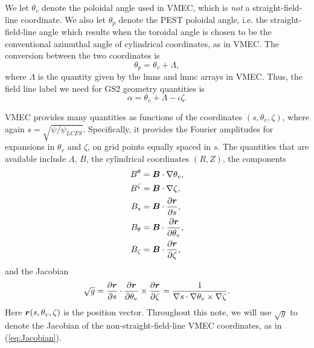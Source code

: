 \documentclass[11pt,letter]{article}
\newcommand{\vect}[1]{\mbox{\boldmath $#1$}}
\begin{document}
We let $\theta_v$ denote the poloidal angle used in VMEC, which is \emph{not} a straight-field-line coordinate.
We also let $\theta_p$ denote the PEST poloidal angle, i.e. the straight-field-line angle which results when
the toroidal angle is chosen to be the conventional azimuthal angle of cylindrical coordinates, as in VMEC.
The conversion between the two coordinates is
\begin{equation}
\theta_p = \theta_v + \Lambda,
\end{equation}
where $\Lambda$ is the quantity given by the {\ttfamily lmns} and {\ttfamily lmnc} arrays in VMEC.
Thus, the field line label we need for GS2 geometry quantities is
\begin{equation}
\alpha = \theta_v + \Lambda - \iota \zeta.
\label{eq:alpha_vmec}
\end{equation}

VMEC provides many quantities as functions of the coordinates $(s, \theta_v, \zeta)$,
where again $s = \sqrt{\psi / \psi_{LCFS}}$.
Specifically, it provides the Fourier amplitudes for expansions in $\theta_v$ and $\zeta$,
on grid points equally spaced in $s$.
The quantities that are available include
$\Lambda$, $B$, the cylindrical coordinates $(R,Z)$, the components
\begin{align}
B^\theta &= \vect{B}\cdot\nabla\theta_v, \nonumber \\
B^\zeta &= \vect{B}\cdot\nabla\zeta, \nonumber \\
B_s &= \vect{B}\cdot\frac{\partial\vect{r}}{\partial s}, \nonumber \\
B_\theta &= \vect{B}\cdot\frac{\partial\vect{r}}{\partial \theta_v}, \nonumber \\
B_\zeta &= \vect{B}\cdot\frac{\partial\vect{r}}{\partial \zeta}, \nonumber
\end{align}
and the Jacobian
\begin{equation}
\sqrt{g} = \frac{\partial \vect{r}}{\partial s} \cdot \frac{\partial \vect{r}}{\partial\theta_v} \times \frac{\partial\vect{r}}{\partial\zeta}
= \frac{1}{\nabla s \cdot \nabla \theta_v \times\nabla\zeta}.
\label{eq:Jacobian}
\end{equation}
Here $\vect{r}(s,\theta_v,\zeta)$ is the position vector.
Throughout this note, we will use $\sqrt{g}$ to denote the Jacobian of the non-straight-field-line
VMEC coordinates, as in (\ref{eq:Jacobian}).

\end{document}
